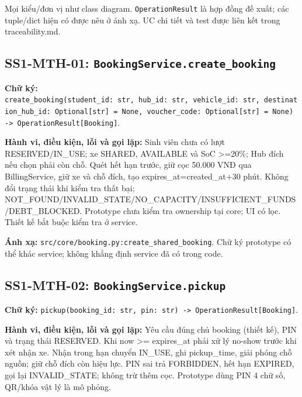 \documentclass[11pt,a4paper]{article}
\begin{document}
Mọi kiểu/đơn vị như class diagram. \texttt{OperationResult} là hợp đồng
đề xuất; các tuple/dict hiện có được nêu ở ánh xạ. UC chi tiết và test
được liên kết trong traceability.md.

\hypertarget{ss1-mth-01-bookingservice.create_booking}{%
\subsection{\texorpdfstring{SS1-MTH-01:
\texttt{BookingService.create\_booking}}{SS1-MTH-01: BookingService.create\_booking}}\label{ss1-mth-01-bookingservice.create_booking}}

\textbf{Chữ ký:}
\texttt{create\_booking(student\_id:\ str,\ hub\_id:\ str,\ vehicle\_id:\ str,\ destination\_hub\_id:\ Optional{[}str{]}\ =\ None,\ voucher\_code:\ Optional{[}str{]}\ =\ None)\ -\textgreater{}\ OperationResult{[}Booking{]}}.

\textbf{Hành vi, điều kiện, lỗi và gọi lặp:} Sinh viên chưa có lượt
RESERVED/IN\_USE; xe SHARED, AVAILABLE và SoC \textgreater=20\%; Hub
đích nếu chọn phải còn chỗ. Quét hết hạn trước, giữ cọc 50.000 VNĐ qua
BillingService, giữ xe và chỗ đích, tạo expires\_at=created\_at+30 phút.
Không đổi trạng thái khi kiểm tra thất bại;
NOT\_FOUND/INVALID\_STATE/NO\_CAPACITY/INSUFFICIENT\_FUNDS/DEBT\_BLOCKED.
Prototype chưa kiểm tra ownership tại core; UI có lọc. Thiết kế bắt buộc
kiểm tra ở service.

\textbf{Ánh xạ:} \texttt{src/core/booking.py:create\_shared\_booking}.
Chữ ký prototype có thể khác service; không khẳng định service đã có
trong code.

\hypertarget{ss1-mth-02-bookingservice.pickup}{%
\subsection{\texorpdfstring{SS1-MTH-02:
\texttt{BookingService.pickup}}{SS1-MTH-02: BookingService.pickup}}\label{ss1-mth-02-bookingservice.pickup}}

\textbf{Chữ ký:}
\texttt{pickup(booking\_id:\ str,\ pin:\ str)\ -\textgreater{}\ OperationResult{[}Booking{]}}.

\textbf{Hành vi, điều kiện, lỗi và gọi lặp:} Yêu cầu đúng chủ booking
(thiết kế), PIN và trạng thái RESERVED. Khi now \textgreater=
expires\_at phải xử lý no-show trước khi xét nhận xe. Nhận trong hạn
chuyển IN\_USE, ghi pickup\_time, giải phóng chỗ nguồn; giữ chỗ đích còn
hiệu lực. PIN sai trả FORBIDDEN, hết hạn EXPIRED, gọi lại
INVALID\_STATE; không trừ thêm cọc. Prototype dùng PIN 4 chữ số, QR/khóa
vật lý là mô phỏng.
\end{document}
